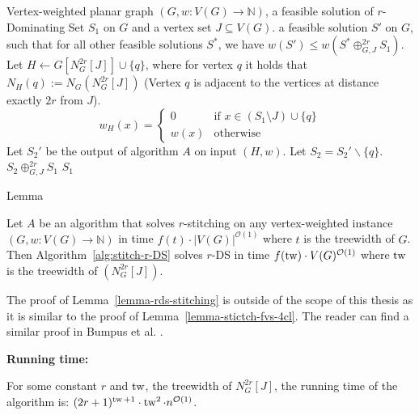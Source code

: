\begin{algorithm}[H]
    \caption{Stitch-r-DS}
    \label{alg:stitch-r-DS}
    \begin{algorithmic}[1]
    \REQUIRE Vertex-weighted planar graph $(G, w:V(G) \to \mathbb{N})$,
    a feasible solution of $r$-Dominating Set $S_1$ on $G$
    and a vertex set $J \subseteq V(G)$.
    \ENSURE a feasible solution $S'$ on $G$, such that for all other feasible solutions $S^{*}$, 
    we have $w(S') \leq w(S^{*} \oplus^{2r}_{G,J} S_1)$. 
    \STATE Let $H \leftarrow G[N^{2r}_{G}[J]] \cup \{q\}$, where for vertex $q$
    it holds that $N_H(q) := N_{G}(N^{2r}_{G}[J])$ (Vertex $q$ is adjacent to the vertices 
    at distance exactly $2r$ from $J$). \label{state:construct-H-rds}
    \STATE \[
    w_H(x) = 
    \begin{cases}
    0 & \text{if } x \in (S_1 \setminus J) \cup \{q\} \\
    w(x) & \text{otherwise}
    \end{cases}
    \]
    \STATE Let $S_2'$ be the output of algorithm $A$ on input $(H, w)$. 
    \STATE Let $S_2 = S_2' \backslash \{q\}$. \label{state:opt-solution-rds}
        \RETURN $S_2 \oplus^{2r}_{G,J} S_1$
    \ELSE
        \RETURN $S_1$
    \ENDIF
    \end{algorithmic}
\end{algorithm}

\begin{mydefinition}[$r$-DS-$(2r)$-stitching]{Lemma}
    \label{lemma-rds-stitching}

    Let $A$ be an algorithm that solves $r$-stitching on any vertex-weighted instance 
    $(G, w : V(G) \to \mathbb{N})$ in time $f(t) \cdot |V(G)|^{\mathcal{O}(1)}$ where 
    $t$ is the treewidth of $G$. Then 
    Algorithm~\ref{alg:stitch-r-DS} solves $r$-DS in time 
    $f(\operatorname{tw}) \cdot V(G)^{\mathcal{O}(1)}$ where $\operatorname{tw}$ is the treewidth of $(N^{2r}_{G}[J])$.

\end{mydefinition}

The proof of Lemma~\ref{lemma-rds-stitching} is outside of the scope of this thesis 
as it is similar to the proof of Lemma~\ref{lemma-stictch-fvs-4cl}. The reader can find 
a similar proof in Bumpus et al. \cite[Lemma 3.3]{bumpus_et_al:LIPIcs.SWAT.2024.19}.

\textbf{Running time:}

For some constant $r$ and $\operatorname{tw}$, the treewidth of $N^{2r}_{G}[J]$, the running time of 
the algorithm is: $(2r+1)^{\operatorname{tw} + 1} \cdot \operatorname{tw}^{2} \cdot n^{\mathcal{O}(1)}$.